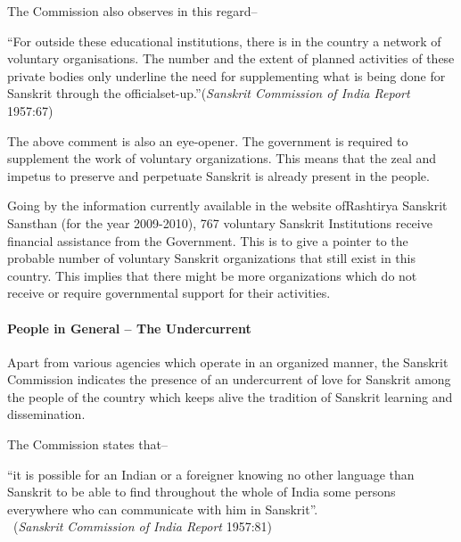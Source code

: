 The Commission also observes in this regard–
\begin{myquote}
\eleven
 “For outside these educational institutions, there is in the country a network of voluntary organisations. The number and the extent of planned activities of these private bodies only underline the need for supplementing what is being done for Sanskrit through the official\break set-up.”\hfill({\sl Sanskrit Commission of India Report} 1957:67)
\end{myquote}

The above comment is also an eye-opener. The government is required to supplement the work of voluntary organizations. This means that the zeal and impetus to preserve and perpetuate Sanskrit is already present in the people.

Going by the information currently available in the website of\break Rashtirya Sanskrit Sansthan (for the year 2009-2010), 767 voluntary Sanskrit Institutions receive financial assistance from the Government. This is to give a pointer to the probable number of voluntary Sanskrit organizations that still exist in this country. This implies that there might be more organizations which do not receive or require governmental support for their activities.   

\paragraph{People in General – The Undercurrent }

Apart from various agencies which operate in an organized manner, the Sanskrit Commission indicates the presence of an undercurrent of love for Sanskrit among the people of the country which keeps alive the tradition of Sanskrit learning and dissemination.

The Commission states that– 
\begin{myquote}
\eleven
“it is possible for an Indian or a foreigner knowing no other language than Sanskrit to be able to find throughout the whole of India some persons everywhere who can communicate with him in Sanskrit”.\\[-15pt] 

~\hfill ({\sl Sanskrit Commission of India Report} 1957:81)
\end{myquote}

